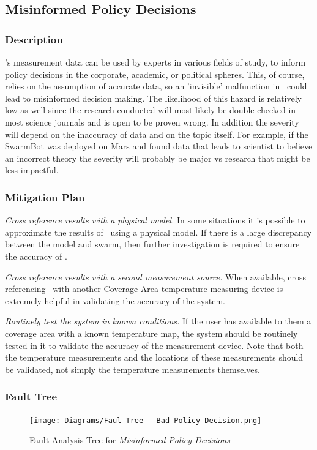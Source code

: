 \documentclass[11pt]{article}
\begin{document}
\subsection{Misinformed Policy Decisions}
\subsubsection*{Description}
\PROJECTNAME's measurement data can be used by experts in various fields of study, to inform
policy decisions in the corporate, academic, or political spheres. This, of course, relies on
the assumption of accurate data, so an 'invisible' malfunction in \PROJECTNAME \ 
could lead to misinformed decision making. The likelihood of this hazard is relatively low as well since the research conducted will most likely be double checked in most science journals and is open to be proven wrong. In addition the severity will depend on the inaccuracy of data and on the topic itself. For example, if the SwarmBot was deployed on Mars and found data that leads to scientist to believe an incorrect theory the severity will probably be major vs research that might be less impactful. 

\subsubsection*{Mitigation Plan}
\textit{Cross reference results with a physical model.} In some situations it is possible to
approximate the results of \PROJECTNAME\ using a physical model. If there is a large discrepancy
between the model and swarm, then further investigation is required to ensure the accuracy of
\PROJECTNAME.

\textit{Cross reference results with a second measurement source.} When available, cross referencing
\PROJECTNAME\ with another Coverage Area temperature measuring device is extremely helpful in validating
the accuracy of the system.

\textit{Routinely test the system in known conditions.} If the user has available to them a coverage area
with a known temperature map, the system should be routinely tested in it to validate the
accuracy of the measurement device. Note that both the temperature measurements and the locations
of these measurements should be validated, not simply the temperature measurements themselves.
\subsubsection*{Fault Tree}
\begin{figure}[H]
   \centering
   \texttt{[image: Diagrams/Faul Tree - Bad Policy Decision.png]} %
   \caption{Fault Analysis Tree for \textit{Misinformed Policy Decisions}}
   \label{fig:ft-Air}
\end{figure}
\end{document}
